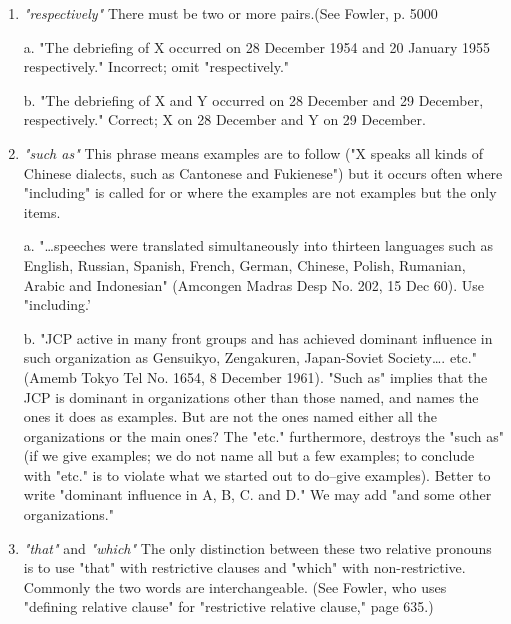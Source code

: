 \documentclass[
    oneside,
    11pt,
    draft
]{memoir}
\begin{document}
\begin{enumerate}
  \item \emph{"respectively"} There must be two or more pairs.(See Fowler, p. 5000
  
  a. "The debriefing of X occurred on 28 December 1954 and 20 January 1955 respectively." Incorrect; omit "respectively." 
  
  b. "The debriefing of X and Y occurred on 28 December and 29 December, respectively." Correct; X on 28 December and Y on 29 December. 
  
  \item \emph{"such as"} This phrase means examples are to follow ("X speaks all kinds of Chinese dialects, such as Cantonese and Fukienese") but it occurs often where "including" is called for or where the examples are not examples but the only items. 
  
  a. "\dots speeches were translated simultaneously into thirteen languages such as English, Russian, Spanish, French, German, Chinese, Polish, Rumanian, Arabic and Indonesian" (Amcongen Madras Desp No. 202, 15 Dec 60). Use "including.' 
  
  b. "JCP active in many front groups and has achieved dominant influence in such organization as Gensuikyo, Zengakuren, Japan-Soviet Society\dots. etc." (Amemb Tokyo Tel No. 1654, 8 December 1961). "Such as" implies that the JCP is dominant in organizations other than those named, and names the ones it does as examples. But are not the ones named either all the organizations or the main ones? The "etc." furthermore, destroys the "such as" (if we give examples; we do not name all but a few examples; to conclude with "etc." is to violate what we started out to do--give examples). Better to write "dominant influence in A, B, C. and D." We may add "and some other organizations."
  
  \item \emph{"that"} and \emph{"which"} The only distinction between these two relative pronouns is to use "that" with restrictive clauses and "which" with non-restrictive. Commonly the two words are interchangeable. (See Fowler, who uses "defining relative clause" for "restrictive relative clause," page 635.) 
  

\end{enumerate}
\end{document}
